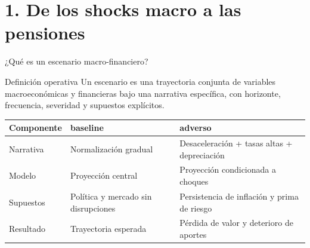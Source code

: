 \documentclass[10pt,aspectratio=169]{beamer}
\newcommand{\baseline}{\textcolor{MacropolTeal}{\textbf{baseline}}}
\newcommand{\adverso}{\textcolor{red!70!black}{\textbf{adverso}}}
\begin{document}
\section{1. De los shocks macro a las pensiones}

\begin{frame}{¿Qué es un escenario macro-financiero?}
\begin{block}{Definición operativa}
Un escenario es una trayectoria conjunta de variables macroeconómicas y financieras bajo una narrativa específica, con horizonte, frecuencia, severidad y supuestos explícitos.
\end{block}

\begin{table}
\small
\begin{tabular}{p{3.2cm}p{4.2cm}p{4.2cm}}
\toprule
Componente & \baseline{} & \adverso{} \\
\midrule
Narrativa & Normalización gradual & Desaceleración + tasas altas + depreciación \\
Modelo & Proyección central & Proyección condicionada a choques \\
Supuestos & Política y mercado sin disrupciones & Persistencia de inflación y prima de riesgo \\
Resultado & Trayectoria esperada & Pérdida de valor y deterioro de aportes \\
\bottomrule
\end{tabular}
\end{table}
\end{frame}
\end{document}
